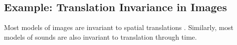 

%




\subsection{Example:  Translation Invariance in Images}

Most models of images are invariant to spatial translations \citep{lecun1995convolutional}.
Similarly, most models of sounds are also invariant to translation through time.

